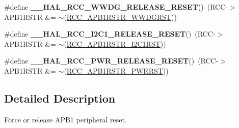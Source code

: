 \begin{DoxyCompactItemize}
\item 
\mbox{\label{group___r_c_c___a_p_b1___force___release___reset_ga63fa37b173c2c1d9249389148f96e5f1}} 
\#define {\bfseries \+\_\+\+\_\+\+H\+A\+L\+\_\+\+R\+C\+C\+\_\+\+W\+W\+D\+G\+\_\+\+R\+E\+L\+E\+A\+S\+E\+\_\+\+R\+E\+S\+ET}()~(R\+CC-\/$>$A\+P\+B1\+R\+S\+TR \&= $\sim$(\hyperlink{group___peripheral___registers___bits___definition_ga0d2591ac0655a8798f4c16cef97e6f94}{R\+C\+C\+\_\+\+A\+P\+B1\+R\+S\+T\+R\+\_\+\+W\+W\+D\+G\+R\+ST}))
\item 
\mbox{\label{group___r_c_c___a_p_b1___force___release___reset_ga87cc8c2107c1d0820cc1f7e2aeb1aeb9}} 
\#define {\bfseries \+\_\+\+\_\+\+H\+A\+L\+\_\+\+R\+C\+C\+\_\+\+I2\+C1\+\_\+\+R\+E\+L\+E\+A\+S\+E\+\_\+\+R\+E\+S\+ET}()~(R\+CC-\/$>$A\+P\+B1\+R\+S\+TR \&= $\sim$(\hyperlink{group___peripheral___registers___bits___definition_gadcd25346a7d7b0009090adfbca899b93}{R\+C\+C\+\_\+\+A\+P\+B1\+R\+S\+T\+R\+\_\+\+I2\+C1\+R\+ST}))
\item 
\mbox{\label{group___r_c_c___a_p_b1___force___release___reset_gaaa5a340d38d50e508243f48bbb47dd32}} 
\#define {\bfseries \+\_\+\+\_\+\+H\+A\+L\+\_\+\+R\+C\+C\+\_\+\+P\+W\+R\+\_\+\+R\+E\+L\+E\+A\+S\+E\+\_\+\+R\+E\+S\+ET}()~(R\+CC-\/$>$A\+P\+B1\+R\+S\+TR \&= $\sim$(\hyperlink{group___peripheral___registers___bits___definition_ga274d8cb48f0e89831efabea66d64af2a}{R\+C\+C\+\_\+\+A\+P\+B1\+R\+S\+T\+R\+\_\+\+P\+W\+R\+R\+ST}))
\end{DoxyCompactItemize}


\subsection{Detailed Description}
Force or release A\+P\+B1 peripheral reset. 


